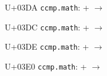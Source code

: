 \documentclass{article}
\begin{document}
\begin{substitutions}
\goodbreak

U+03DA  \linebreak
    \texttt{ccmp.math}:
\linebreak\null\quad{} \space +  \space $\to$  

\goodbreak

U+03DC  \linebreak
    \texttt{ccmp.math}:
\linebreak\null\quad{} \space +  \space $\to$  

\goodbreak

U+03DE  \linebreak
    \texttt{ccmp.math}:
\linebreak\null\quad{} \space +  \space $\to$  

\goodbreak

U+03E0  \linebreak
    \texttt{ccmp.math}:
\linebreak\null\quad{} \space +  \space $\to$  

\goodbreak

\end{substitutions}

\clearpage
\end{document}
